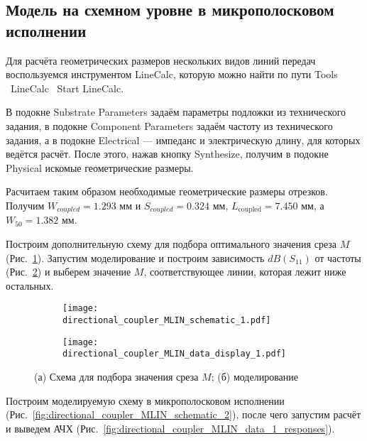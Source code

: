 \subsection{Модель на схемном уровне в микрополосковом исполнении}

Для расчёта геометрических размеров нескольких видов линий передач воспользуемся инструментом LineCalc, которую можно найти по пути Tools \textrightarrow\ LineCalc \textrightarrow\ Start LineCalc.

В подокне Substrate Parameters задаём параметры подложки из технического задания, в подокне Component Parameters задаём частоту из технического задания, а в подокне Electrical --- импеданс и электрическую длину, для которых ведётся расчёт.
После этого, нажав кнопку Synthesize, получим в подокне Physical искомые геометрические размеры.

Расчитаем таким образом необходимые геометрические размеры отрезков.
Получим $W_{coupled} = 1.293 \text{~мм}$ и $S_{coupled} = 0.324 \text{~мм}$, $L_\text{coupled} = 7.450 \text{~мм}$, а $W_{50} = 1.382 \text{~мм}$.

Построим дополнительную схему для подбора оптимального значения среза $M$ (Рис.~\ref{fig:directional_coupler_MLIN_schematic_1}). Запустим моделирование и построим зависимость $dB(S_{11})$ от частоты (Рис.~\ref{fig:directional_coupler_MLIN_data_display_1}) и выберем значение $M$, соответствующее линии, которая лежит ниже остальных.

\begin{figure}[!ht]
    \centering
    \begin{subfigure}[b]{0.50\textwidth}
        \centering
        \texttt{[image: directional\_coupler\_MLIN\_schematic\_1.pdf]}
        \caption{}%
    \label{fig:directional_coupler_MLIN_schematic_1}
    \end{subfigure}
    \hfill
    \begin{subfigure}[b]{0.40\textwidth}
        \centering
        \texttt{[image: directional\_coupler\_MLIN\_data\_display\_1.pdf]}
        \caption{}%
    \label{fig:directional_coupler_MLIN_data_display_1}
    \end{subfigure}
    \caption{%
        (а) Схема для подбора значения среза $M$;
        (б) моделирование
    }%
    \label{fig:directional_coupler_MLIN_miter}
\end{figure}

Построим моделируемую схему в микрополосковом исполнении (Рис.~\ref{fig:directional_coupler_MLIN_schematic_2}), после чего запустим расчёт и выведем АЧХ (Рис.~\ref{fig:directional_coupler_MLIN_data_1_responses}).

